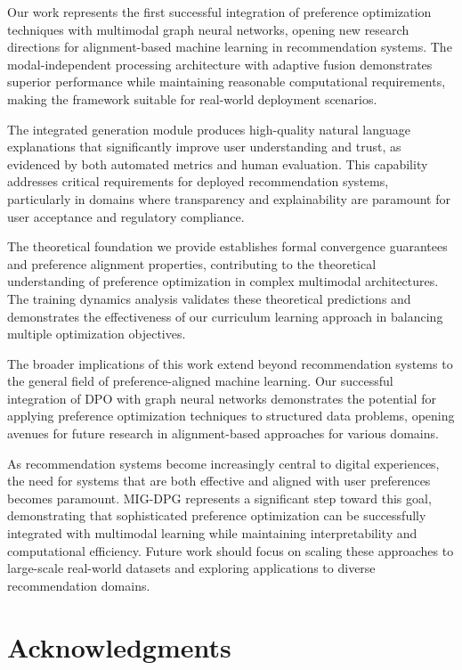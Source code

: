 \documentclass[pdflatex,sn-mathphys-num]{sn-jnl}%
\theoremstyle{thmstyleone}%
\theoremstyle{thmstyletwo}%
\theoremstyle{thmstylethree}%
\begin{document}
Our work represents the first successful integration of preference optimization techniques with multimodal graph neural networks, opening new research directions for alignment-based machine learning in recommendation systems. The modal-independent processing architecture with adaptive fusion demonstrates superior performance while maintaining reasonable computational requirements, making the framework suitable for real-world deployment scenarios.

The integrated generation module produces high-quality natural language explanations that significantly improve user understanding and trust, as evidenced by both automated metrics and human evaluation. This capability addresses critical requirements for deployed recommendation systems, particularly in domains where transparency and explainability are paramount for user acceptance and regulatory compliance.

The theoretical foundation we provide establishes formal convergence guarantees and preference alignment properties, contributing to the theoretical understanding of preference optimization in complex multimodal architectures. The training dynamics analysis validates these theoretical predictions and demonstrates the effectiveness of our curriculum learning approach in balancing multiple optimization objectives.

The broader implications of this work extend beyond recommendation systems to the general field of preference-aligned machine learning. Our successful integration of DPO with graph neural networks demonstrates the potential for applying preference optimization techniques to structured data problems, opening avenues for future research in alignment-based approaches for various domains.

As recommendation systems become increasingly central to digital experiences, the need for systems that are both effective and aligned with user preferences becomes paramount. MIG-DPG represents a significant step toward this goal, demonstrating that sophisticated preference optimization can be successfully integrated with multimodal learning while maintaining interpretability and computational efficiency. Future work should focus on scaling these approaches to large-scale real-world datasets and exploring applications to diverse recommendation domains.

\section*{Acknowledgments}
\end{document}

